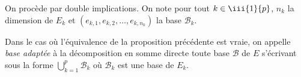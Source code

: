 \documentclass[french,11pt,twoside]{VcCours}
\newcommand{\Sum}[2]{\sum_{#1}^{#2}}
\begin{document}
\begin{Demonstration}{} On procède par double implications. On note pour tout $k \in \iii{1}{p}$, $n_k$ la dimension de $E_k$ et $(e_{k,1}, e_{k,2}, \ldots, e_{k,n_k})$ la base $\mathcal{B}_k$.

\medskip
%
%
%
%
%
\vspace{13cm}
\end{Demonstration}

\begin{Definition}{} Dans le cas où l'équivalence de la proposition précédente est vraie, on appelle \emph{base adaptée} à la décomposition en somme directe toute base $\mathcal{B}$ de $E$ s'écrivant sous la forme $\bigcup_{k=1}^p \mathcal{B}_k$ où $\mathcal{B}_k$ est une base de $E_k$.
\end{Definition}
\end{document}
